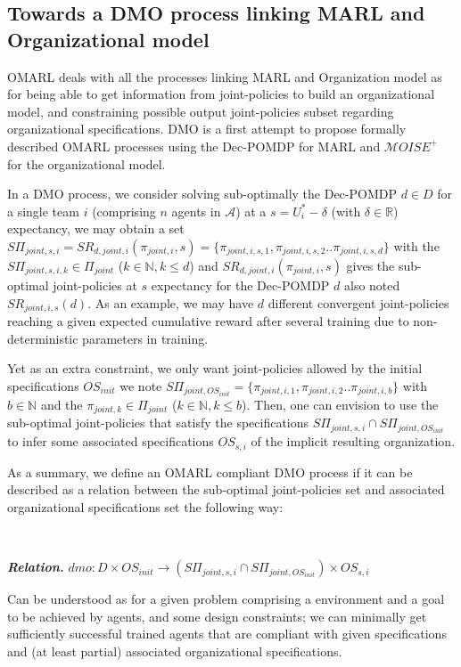 \documentclass[runningheads]{llncs}
\newcounter{relation}
\renewcommand{\therelation}{\arabic{relation}}
\newenvironment{relation}[1][]{%
    \refstepcounter{relation}%
    \noindent \raggedright \textit{\textbf{Relation. \therelation}} \hfill$}
{%
$ \hfill \phantom{x}

}
\begin{document}
\subsection{Towards a DMO process linking MARL and Organizational model}

OMARL deals with all the processes linking MARL and Organization model as for being able to get information from joint-policies to build an organizational model, and constraining possible output joint-policies subset regarding organizational specifications. DMO is a first attempt to propose formally described OMARL processes using the Dec-POMDP for MARL and $\mathcal{M}OISE^+$ for the organizational model.

In a DMO process, we consider solving sub-optimally the Dec-POMDP $d \in D$ for a single team $i$ (comprising $n$ agents in $\mathcal{A}$) at a $s = U_i^* - \delta$ (with $\delta \in \mathbb{R}$) expectancy, we may obtain a set $S\Pi_{joint,s,i} = SR_{d,joint,i}(\pi_{joint,i},s) = \{\pi_{joint,i,s,1}, \pi_{joint,i,s,2} .. \pi_{joint,i,s,d}\}$ with the $S\Pi_{joint,s,i,k} \in \Pi_{joint}$ ($k \in \mathbb{N}, k \leq d$) and $SR_{d,joint,i}(\pi_{joint,i},s)$ gives the sub-optimal joint-policies at $s$ expectancy for the Dec-POMDP $d$ also noted $SR_{joint,i,s}(d)$. As an example, we may have $d$ different convergent joint-policies reaching a given expected cumulative reward after several training due to non-deterministic parameters in training.

Yet as an extra constraint, we only want joint-policies allowed by the initial specifications $OS_{init}$ we note $S\Pi_{joint,OS_{init}} = \{\pi_{joint,i,1}, \pi_{joint,i,2} .. \pi_{joint,i,b}\}$ with $b \in \mathbb{N}$ and the $\pi_{joint,k} \in \Pi_{joint}$ ($k \in \mathbb{N}, k \leq b$). Then, one can envision to use the sub-optimal joint-policies that satisfy the specifications $S\Pi_{joint,s,i} \cap S\Pi_{joint,OS_{init}}$ to infer some associated specifications $OS_{s,i}$ of the implicit resulting organization.

As a summary, we define an OMARL compliant DMO process if it can be described as a relation between the sub-optimal joint-policies set and associated organizational specifications set the following way:

\

\begin{relation}\label{rel:def_dmo}
    dmo: D \times OS_{init} \rightarrow (S\Pi_{joint,s,i} \cap S\Pi_{joint,OS_{init}}) \times OS_{s,i}
\end{relation}
Can be understood as for a given problem comprising a environment and a goal to be achieved by agents, and some design constraints; we can minimally get sufficiently successful trained agents that are compliant with given specifications and (at least partial) associated organizational specifications.
\end{document}
